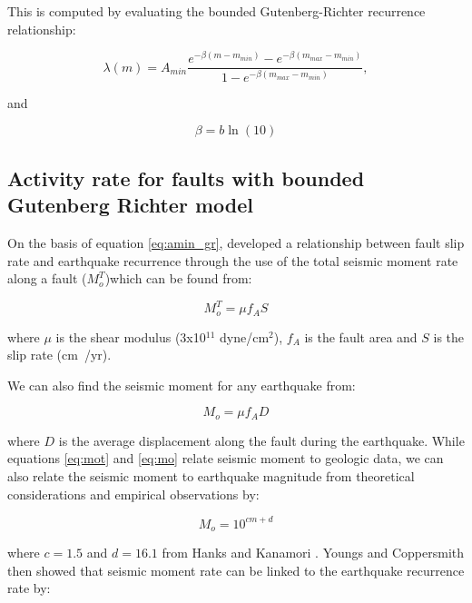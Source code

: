 \begin{enumerate}
This is computed by evaluating the bounded Gutenberg-Richter recurrence relationship:

\begin{equation} \label{eq:amin_gr}
\lambda(m) =
A_{min}\frac{e^{-\beta(m-m_{min})}-e^{-\beta(m_{max}-m_{min})}}{1-e^{-\beta(m_{max}-m_{min})}},
\end{equation}

\citet{dr_kramer96a} and 

\begin{equation}
\beta = b\ln(10)
\end{equation}



\subsection{Activity rate for faults with bounded Gutenberg Richter model}
\label{sec:rv_flt_GR}
On the basis of equation \ref{eq:amin_gr},  \citet{eqrm_Youngs85} developed a relationship between fault slip 
rate and earthquake recurrence through the use of the total seismic moment rate along a fault ($M_o^T$)which can be found from:

\begin{equation} \label{eq:mot}
M_o^T = \mu f_A S
\end{equation}

where $\mu$ is the shear modulus (3x10$^{11}$ dyne/cm$^2$), $f_A$ is the fault area and $S$ is the slip rate (cm~/yr). 

We can also find the seismic moment for any earthquake from:

\begin{equation} \label{eq:mo}
M_o = \mu f_A D
\end{equation}

where $D$ is the average displacement along the fault during the earthquake. While equations \ref{eq:mot} and \ref{eq:mo} relate 
seismic moment to geologic data, we can also relate the seismic moment to earthquake magnitude from theoretical considerations and 
empirical observations by:

\begin{equation} \label{eq:mo_mag}
M_o = 10^{cm+d}
\end{equation}

where $c=1.5$ and $d=16.1$ from Hanks and Kanamori \citet{eqrm_Hanks1979}. Youngs and Coppersmith \citet{eqrm_Youngs1985} then showed that seismic 
moment rate can be linked to the earthquake recurrence rate by:


\end{enumerate}
